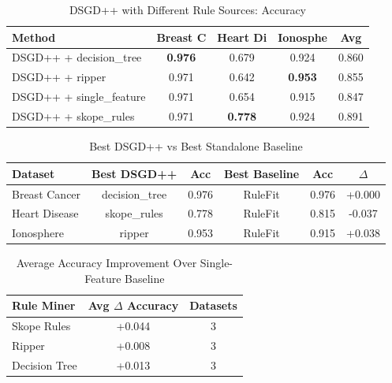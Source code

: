 
\usepackage{booktabs}

\begin{table}[htbp]
\centering
\caption{DSGD++ with Different Rule Sources: Accuracy}
\label{tab:e1_accuracy}
\begin{tabular}{lcccc}
\toprule
Method & Breast C & Heart Di & Ionosphe & Avg \\
\midrule
DSGD++ + decision_tree & \textbf{0.976} & 0.679 & 0.924 & 0.860 \\
DSGD++ + ripper & 0.971 & 0.642 & \textbf{0.953} & 0.855 \\
DSGD++ + single_feature & 0.971 & 0.654 & 0.915 & 0.847 \\
DSGD++ + skope_rules & 0.971 & \textbf{0.778} & 0.924 & 0.891 \\
\bottomrule
\end{tabular}
\end{table}

\begin{table}[htbp]
\centering
\caption{Best DSGD++ vs Best Standalone Baseline}
\label{tab:dsgd_vs_baseline}
\begin{tabular}{lccccc}
\toprule
Dataset & Best DSGD++ & Acc & Best Baseline & Acc & $\Delta$ \\
\midrule
Breast Cancer & decision_tree & 0.976 & RuleFit & 0.976 & +0.000 \\
Heart Disease & skope_rules & 0.778 & RuleFit & 0.815 & -0.037 \\
Ionosphere & ripper & 0.953 & RuleFit & 0.915 & +0.038 \\
\bottomrule
\end{tabular}
\end{table}

\begin{table}[htbp]
\centering
\caption{Average Accuracy Improvement Over Single-Feature Baseline}
\label{tab:miner_improvement}
\begin{tabular}{lcc}
\toprule
Rule Miner & Avg $\Delta$ Accuracy & Datasets \\
\midrule
Skope Rules & +0.044 & 3 \\
Ripper & +0.008 & 3 \\
Decision Tree & +0.013 & 3 \\
\bottomrule
\end{tabular}
\end{table}